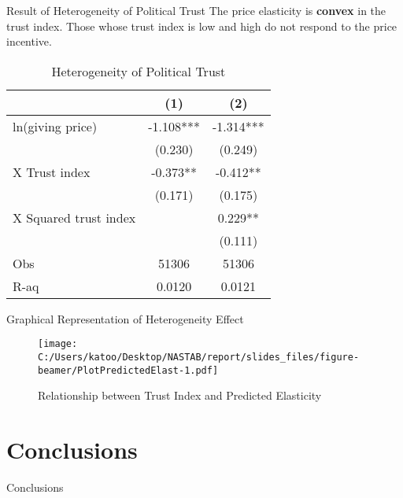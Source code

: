 \documentclass[
  ignorenonframetext,
]{beamer}
\begin{document}
\begin{frame}{Result of Heterogeneity of Political Trust}
\protect\hypertarget{result-of-heterogeneity-of-political-trust}{}
The price elasticity is \textbf{convex} in the trust index. Those whose
trust index is low and high do not respond to the price incentive.

\begin{table}

\caption{\label{tab:kableTabTrustHetero2Reg}Heterogeneity of Political Trust}
\centering
\begin{tabular}[t]{lcc}
\toprule
 & (1) & (2)\\
\midrule
ln(giving price) & -1.108*** & -1.314***\\
 & (0.230) & (0.249)\\
\hspace{1em}X Trust index & -0.373** & -0.412**\\
 & (0.171) & (0.175)\\
\hspace{1em}X Squared trust index &  & 0.229**\\
 &  & (0.111)\\
Obs & 51306 & 51306\\
R-aq & 0.0120 & 0.0121\\
\bottomrule
\end{tabular}
\end{table}
\end{frame}

\begin{frame}{Graphical Representation of Heterogeneity Effect}
\protect\hypertarget{graphical-representation-of-heterogeneity-effect}{}
\begin{figure}
\centering
\texttt{[image: C:/Users/katoo/Desktop/NASTAB/report/slides\_files/figure-beamer/PlotPredictedElast-1.pdf]}
\caption{Relationship between Trust Index and Predicted Elasticity}
\end{figure}
\end{frame}

\hypertarget{conclusions}{%
\section{Conclusions}\label{conclusions}}

\begin{frame}{Conclusions}
\protect\hypertarget{conclusions-1}{}
\end{frame}
\end{document}
